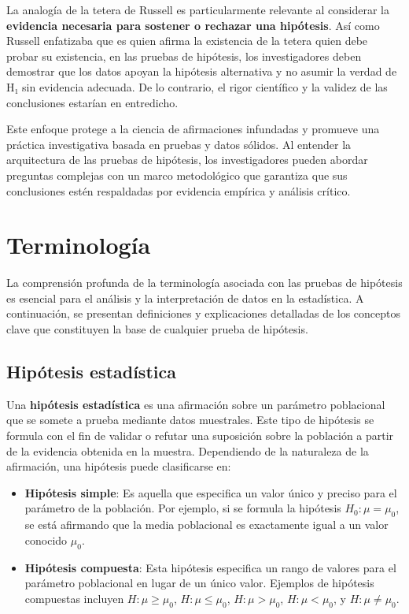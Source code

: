 \documentclass[
  letterpaper,
  DIV=11,
  numbers=noendperiod]{scrreprt}
\providecommand{\tightlist}{%
  \setlength{\itemsep}{0pt}\setlength{\parskip}{0pt}}\usepackage{longtable,booktabs,array}
\begin{document}
La analogía de la tetera de Russell es particularmente relevante al
considerar la \textbf{evidencia necesaria para sostener o rechazar una
hipótesis}. Así como Russell enfatizaba que es quien afirma la
existencia de la tetera quien debe probar su existencia, en las pruebas
de hipótesis, los investigadores deben demostrar que los datos apoyan la
hipótesis alternativa y no asumir la verdad de H₁ sin evidencia
adecuada. De lo contrario, el rigor científico y la validez de las
conclusiones estarían en entredicho.

Este enfoque protege a la ciencia de afirmaciones infundadas y promueve
una práctica investigativa basada en pruebas y datos sólidos. Al
entender la arquitectura de las pruebas de hipótesis, los investigadores
pueden abordar preguntas complejas con un marco metodológico que
garantiza que sus conclusiones estén respaldadas por evidencia empírica
y análisis crítico.

\section{Terminología}\label{terminologuxeda}

La comprensión profunda de la terminología asociada con las pruebas de
hipótesis es esencial para el análisis y la interpretación de datos en
la estadística. A continuación, se presentan definiciones y
explicaciones detalladas de los conceptos clave que constituyen la base
de cualquier prueba de hipótesis.

\subsection{Hipótesis estadística}\label{hipuxf3tesis-estaduxedstica}

Una \textbf{hipótesis estadística} es una afirmación sobre un parámetro
poblacional que se somete a prueba mediante datos muestrales. Este tipo
de hipótesis se formula con el fin de validar o refutar una suposición
sobre la población a partir de la evidencia obtenida en la muestra.
Dependiendo de la naturaleza de la afirmación, una hipótesis puede
clasificarse en:

\begin{itemize}
\tightlist
\item
  \textbf{Hipótesis simple}: Es aquella que especifica un valor único y
  preciso para el parámetro de la población. Por ejemplo, si se formula
  la hipótesis \(H_0: \mu = \mu_0\), se está afirmando que la media
  poblacional es exactamente igual a un valor conocido \(\mu_0\).
\item
  \textbf{Hipótesis compuesta}: Esta hipótesis especifica un rango de
  valores para el parámetro poblacional en lugar de un único valor.
  Ejemplos de hipótesis compuestas incluyen \(H: \mu \geq \mu_0\),
  \(H: \mu \leq \mu_0\), \(H: \mu > \mu_0\), \(H: \mu < \mu_0\), y
  \(H: \mu \neq \mu_0\).
\end{itemize}
\end{document}
